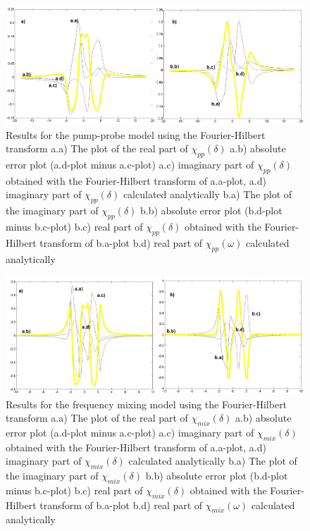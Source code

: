 \documentclass[12pt,twoside,a4paper]{article}
\numberwithin{equation}{subsection}
\numberwithin{figure}{subsection}
\begin{document}
\begin{figure} 
  \includegraphics[width=150mm]{img/four_pnp.png}
  \caption{Results for the pump-probe model using the Fourier-Hilbert transform
     a.a) The plot of the real part of ${\chi_{pp}}(\delta )$
     a.b) absolute error plot (a.d-plot minus a.c-plot)
     a.c) imaginary part of ${\chi_{pp}}(\delta )$ obtained with the Fourier-Hilbert transform of a.a-plot, 
     a.d) imaginary part of ${\chi_{pp}}(\delta )$ calculated analytically 
     b.a) The plot of the imaginary part of ${\chi_{pp}}(\delta )$ 
     b.b) absolute error plot (b.d-plot minus b.c-plot)
     b.c) real part of ${\chi_{pp}}(\delta )$ obtained with the Fourier-Hilbert transform of b.a-plot 
     b.d) real part of $\chi_{pp} (\omega )$ calculated analytically 
     \label{fig:four_pnp}
     }
\end{figure} 

\begin{figure} 
  \includegraphics[width=150mm]{img/four_fmix.png}
  \caption{Results for the frequency mixing model using the Fourier-Hilbert transform
     a.a) The plot of the real part of ${\chi_{mix}}(\delta )$
     a.b) absolute error plot (a.d-plot minus a.c-plot)
     a.c) imaginary part of ${\chi_{mix}}(\delta )$ obtained with the Fourier-Hilbert transform of a.a-plot, 
     a.d) imaginary part of ${\chi_{mix}}(\delta )$ calculated analytically 
     b.a) The plot of the imaginary part of ${\chi_{mix}}(\delta )$ 
     b.b) absolute error plot (b.d-plot minus b.c-plot)
     b.c) real part of ${\chi_{mix}}(\delta )$ obtained with the Fourier-Hilbert transform of b.a-plot  
     b.d) real part of $\chi_{mix} (\omega )$ calculated analytically 
     \label{fig:four_fmix}
     }
\end{figure}
\end{document}
